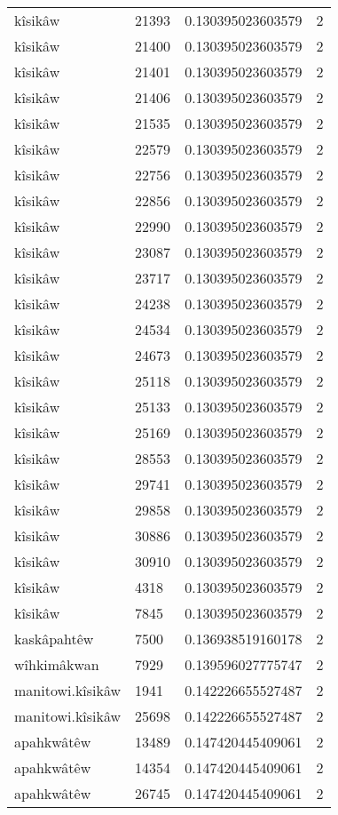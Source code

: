 \begin{longtable}{llll}
kîsikâw & 21393 & 0.130395023603579 & 2 \\
kîsikâw & 21400 & 0.130395023603579 & 2 \\
kîsikâw & 21401 & 0.130395023603579 & 2 \\
kîsikâw & 21406 & 0.130395023603579 & 2 \\
kîsikâw & 21535 & 0.130395023603579 & 2 \\
kîsikâw & 22579 & 0.130395023603579 & 2 \\
kîsikâw & 22756 & 0.130395023603579 & 2 \\
kîsikâw & 22856 & 0.130395023603579 & 2 \\
kîsikâw & 22990 & 0.130395023603579 & 2 \\
kîsikâw & 23087 & 0.130395023603579 & 2 \\
kîsikâw & 23717 & 0.130395023603579 & 2 \\
kîsikâw & 24238 & 0.130395023603579 & 2 \\
kîsikâw & 24534 & 0.130395023603579 & 2 \\
kîsikâw & 24673 & 0.130395023603579 & 2 \\
kîsikâw & 25118 & 0.130395023603579 & 2 \\
kîsikâw & 25133 & 0.130395023603579 & 2 \\
kîsikâw & 25169 & 0.130395023603579 & 2 \\
kîsikâw & 28553 & 0.130395023603579 & 2 \\
kîsikâw & 29741 & 0.130395023603579 & 2 \\
kîsikâw & 29858 & 0.130395023603579 & 2 \\
kîsikâw & 30886 & 0.130395023603579 & 2 \\
kîsikâw & 30910 & 0.130395023603579 & 2 \\
kîsikâw & 4318 & 0.130395023603579 & 2 \\
kîsikâw & 7845 & 0.130395023603579 & 2 \\
kaskâpahtêw & 7500 & 0.136938519160178 & 2 \\
wîhkimâkwan & 7929 & 0.139596027775747 & 2 \\
manitowi.kîsikâw & 1941 & 0.142226655527487 & 2 \\
manitowi.kîsikâw & 25698 & 0.142226655527487 & 2 \\
apahkwâtêw & 13489 & 0.147420445409061 & 2 \\
apahkwâtêw & 14354 & 0.147420445409061 & 2 \\
apahkwâtêw & 26745 & 0.147420445409061 & 2 \\

\end{longtable}

